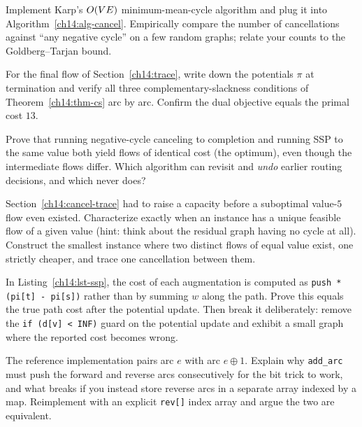 \begin{exercise}
Implement Karp's $O(VE)$ minimum-mean-cycle algorithm and plug it into Algorithm~\ref{ch14:alg-cancel}. Empirically compare the number of cancellations against ``any negative cycle'' on a few random graphs; relate your counts to the Goldberg--Tarjan bound.
\end{exercise}

\begin{exercise}
For the final flow of Section~\ref{ch14:trace}, write down the potentials $\pi$ at termination and verify all three complementary-slackness conditions of Theorem~\ref{ch14:thm-cs} arc by arc. Confirm the dual objective equals the primal cost $13$.
\end{exercise}

\begin{exercise}
Prove that running negative-cycle canceling to completion and running SSP to the same value both yield flows of identical cost (the optimum), even though the intermediate flows differ. Which algorithm can revisit and \emph{undo} earlier routing decisions, and which never does?
\end{exercise}

\begin{exercise}
Section~\ref{ch14:cancel-trace} had to raise a capacity before a suboptimal value-$5$ flow even existed. Characterize exactly when an instance has a unique feasible flow of a given value (hint: think about the residual graph having no cycle at all). Construct the smallest instance where two distinct flows of equal value exist, one strictly cheaper, and trace one cancellation between them.
\end{exercise}

\begin{exercise}
In Listing~\ref{ch14:lst-ssp}, the cost of each augmentation is computed as \texttt{push * (pi[t] - pi[s])} rather than by summing $w$ along the path. Prove this equals the true path cost after the potential update. Then break it deliberately: remove the \texttt{if (d[v] < INF)} guard on the potential update and exhibit a small graph where the reported cost becomes wrong.
\end{exercise}

\begin{exercise}
The reference implementation pairs arc $e$ with arc $e\oplus 1$. Explain why \texttt{add\_arc} must push the forward and reverse arcs consecutively for the bit trick to work, and what breaks if you instead store reverse arcs in a separate array indexed by a map. Reimplement with an explicit \texttt{rev[]} index array and argue the two are equivalent.
\end{exercise}
